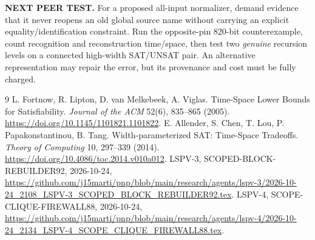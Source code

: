 \documentclass[11pt]{article}
\begin{document}
\textbf{NEXT PEER TEST.} For a proposed all-input normalizer,
demand evidence that it never reopens an old global source name
without carrying an explicit equality/identification constraint.
Run the opposite-pin 820-bit counterexample, count recognition
and reconstruction time/space, then test two \emph{genuine}
recursion levels on a connected high-width SAT/UNSAT pair.
An alternative representation may repair the error, but its
provenance and cost must be fully charged.

\begin{thebibliography}{9}
 L. Fortnow, R. Lipton, D. van Melkebeek, A. Viglas.
Time-Space Lower Bounds for Satisfiability.
\emph{Journal of the ACM} 52(6), 835--865 (2005).
\url{https://doi.org/10.1145/1101821.1101822}.
 E. Allender, S. Chen, T. Lou, P. Papakonstantinou,
B. Tang. Width-parameterized SAT: Time-Space Tradeoffs.
\emph{Theory of Computing} 10, 297--339 (2014).
\url{https://doi.org/10.4086/toc.2014.v010a012}.
 LSPV-3,
SCOPED-BLOCK-REBUILDER92, 2026-10-24,
\url{https://github.com/j15marti/pnp/blob/main/research/agents/lspv-3/2026-10-24_2108_LSPV-3_SCOPED_BLOCK_REBUILDER92.tex}.
 LSPV-4,
SCOPE-CLIQUE-FIREWALL88, 2026-10-24,
\url{https://github.com/j15marti/pnp/blob/main/research/agents/lspv-4/2026-10-24_2134_LSPV-4_SCOPE_CLIQUE_FIREWALL88.tex}.
\end{thebibliography}
\end{document}
